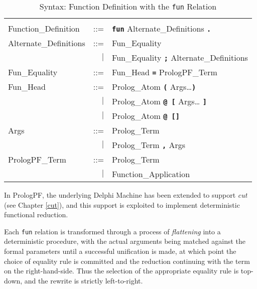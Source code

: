 \begin{table}[htbp]
{\small
\begin{tabular}{|l r l|}
\hline
 & &\\[2mm]
Function\_{}Definition & ::= & \texttt{\textbf{fun}}
                               Alternate\_{}Definitions
                               \texttt{\textbf{.}}\\[4mm]

Alternate\_{}Definitions & ::= & Fun\_{}Equality\\
                      & $|$ & Fun\_{}Equality \texttt{\textbf{;}}
                              Alternate\_{}Definitions\\[4mm]

Fun\_{}Equality  & ::= & Fun\_{}Head \texttt{\textbf{=}} PrologPF\_{}Term\\[4mm]

Fun\_{}Head      & ::= & Prolog\_{}Atom \texttt{\textbf{(}} Args\ldots \texttt{\textbf{)}}\\
                 &  $|$  & Prolog\_{}Atom \texttt{\textbf{@ [}} Args\ldots
                            \texttt{\textbf{]}}\\
                 &  $|$  & Prolog\_{}Atom \texttt{\textbf{@ []}}\\[4mm]

Args             & ::= & Prolog\_{}Term\\
                 &   $|$ & Prolog\_{}Term \texttt{\textbf{,}} Args\\[4mm]

PrologPF\_{}Term & ::= & Prolog\_{}Term\\
                 & $|$ & Function\_{}Application\\[4mm]
 
\hline
\end{tabular}
}
\caption{Syntax: Function Definition with the \texttt{fun} Relation}
\label{syntax:fun}
\end{table}

In PrologPF, the underlying Delphi Machine has been extended to support \textit{cut}
(see Chapter \ref{cut}), and this support is exploited to implement deterministic 
functional reduction.

Each \texttt{fun} relation is transformed through a process of \textit{flattening}
\cite{CF93} into a deterministic procedure, with the actual arguments being
matched against the formal parameters until a successful unification is made, at which
point the choice of equality rule is committed and the reduction continuing with the
term on the right-hand-side.
Thus the selection of the appropriate equality rule is top-down, and the rewrite
is strictly left-to-right.

